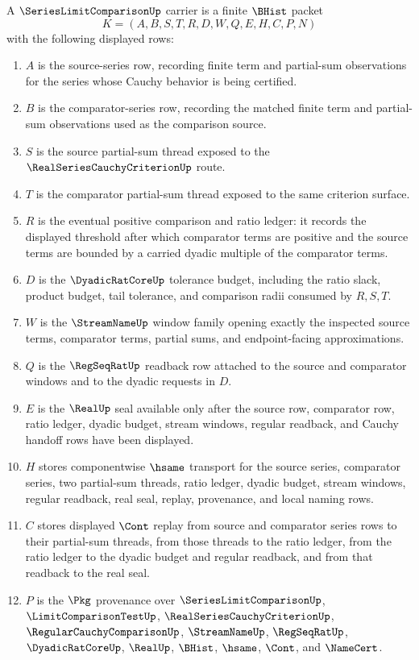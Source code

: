 \begin{definition}\label{def:series-limit-comparison-carrier}
A $\SeriesLimitComparisonUp$ carrier is a finite $\BHist$ packet
$$
K=(A,B,S,T,R,D,W,Q,E,H,C,P,N)
$$
with the following displayed rows:
\begin{enumerate}
\item $A$ is the source-series row, recording finite term and partial-sum observations for the series whose Cauchy behavior is being certified.
\item $B$ is the comparator-series row, recording the matched finite term and partial-sum observations used as the comparison source.
\item $S$ is the source partial-sum thread exposed to the $\RealSeriesCauchyCriterionUp$ route.
\item $T$ is the comparator partial-sum thread exposed to the same criterion surface.
\item $R$ is the eventual positive comparison and ratio ledger: it records the displayed threshold after which comparator terms are positive and the source terms are bounded by a carried dyadic multiple of the comparator terms.
\item $D$ is the $\DyadicRatCoreUp$ tolerance budget, including the ratio slack, product budget, tail tolerance, and comparison radii consumed by $R,S,T$.
\item $W$ is the $\StreamNameUp$ window family opening exactly the inspected source terms, comparator terms, partial sums, and endpoint-facing approximations.
\item $Q$ is the $\RegSeqRatUp$ readback row attached to the source and comparator windows and to the dyadic requests in $D$.
\item $E$ is the $\RealUp$ seal available only after the source row, comparator row, ratio ledger, dyadic budget, stream windows, regular readback, and Cauchy handoff rows have been displayed.
\item $H$ stores componentwise $\hsame$ transport for the source series, comparator series, two partial-sum threads, ratio ledger, dyadic budget, stream windows, regular readback, real seal, replay, provenance, and local naming rows.
\item $C$ stores displayed $\Cont$ replay from source and comparator series rows to their partial-sum threads, from those threads to the ratio ledger, from the ratio ledger to the dyadic budget and regular readback, and from that readback to the real seal.
\item $P$ is the $\Pkg$ provenance over $\SeriesLimitComparisonUp$, $\LimitComparisonTestUp$, $\RealSeriesCauchyCriterionUp$, $\RegularCauchyComparisonUp$, $\StreamNameUp$, $\RegSeqRatUp$, $\DyadicRatCoreUp$, $\RealUp$, $\BHist$, $\hsame$, $\Cont$, and $\NameCert$.

\end{enumerate}
\end{definition}
